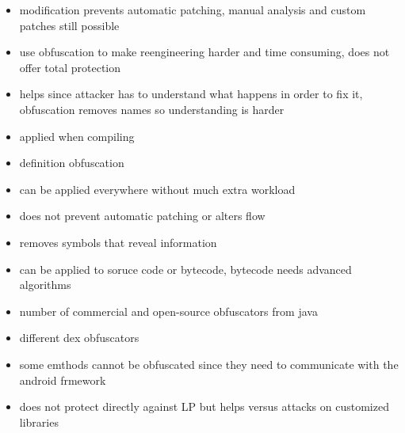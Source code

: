 \begin{itemize}
  \item modification prevents automatic patching, manual analysis and custom patches still possible
  \item use obfuscation to make reengineering harder and time consuming, does not offer total protection
  \item helps since attacker has to understand what happens in order to fix it, obfuscation removes names so understanding is harder
  \item  applied when compiling
  \item definition obfuscation
  \item can be applied everywhere without much extra workload
  \item does not prevent automatic patching or alters flow
  \item removes symbols that reveal information
  \item can be applied to soruce code or bytecode, bytecode needs advanced algorithms
  \item  number of commercial and open-source obfuscators from java
  \item different dex obfuscators
  \item some emthods cannot be obfuscated since they need to communicate with the android frmework
  \item does not protect directly against LP but helps versus attacks on customized libraries
\end{itemize}
